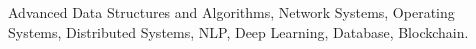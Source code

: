 Advanced Data Structures and Algorithms, Network
Systems, Operating Systems, Distributed Systems, NLP, Deep Learning, Database, Blockchain.